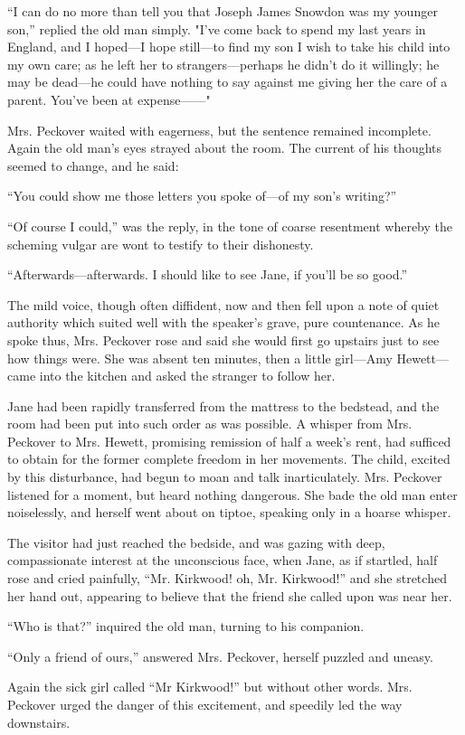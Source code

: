 ``I can do no more than tell you that Joseph James Snowdon was my
younger son,'' replied the old man simply. "I've come back to spend my
last years in England, and I hoped---I hope still---to find my son {}I
wish to take his child into my own care; as he left her to
strangers---perhaps he didn't do it willingly; he may be dead---he could
have nothing to say against me giving her the care of a parent. You've
been at expense{{------}}"

Mrs. Peckover waited with eagerness, but the sentence remained
incomplete. Again the old man's eyes strayed about the room. The current
of his thoughts seemed to change, and he said:

``You could show me those letters you spoke of---of my son's writing?''

``Of course I could,'' was the reply, in the tone of coarse resentment
whereby the scheming vulgar are wont to testify to their dishonesty.

``Afterwards---afterwards. I should like to see Jane, if you'll be so
good.''

The mild voice, though often diffident, now and then fell upon a note of
quiet authority which suited well with the speaker's grave, pure
countenance. As he spoke thus, Mrs. Peckover rose and said she would
first go upstairs just to see how things were. She was {}absent ten
minutes, then a little girl---Amy Hewett---came into the kitchen and
asked the stranger to follow her.

Jane had been rapidly transferred from the mattress to the bedstead, and
the room had been put into such order as was possible. A whisper from
Mrs. Peckover to Mrs. Hewett, promising remission of half a week's rent,
had sufficed to obtain for the former complete freedom in her movements.
The child, excited by this disturbance, had begun to moan and talk
inarticulately. Mrs. Peckover listened for a moment, but heard nothing
dangerous. She bade the old man enter noiselessly, and herself went
about on tiptoe, speaking only in a hoarse whisper.

The visitor had just reached the bedside, and was gazing with deep,
compassionate interest at the unconscious face, when Jane, as if
startled, half rose and cried painfully, ``Mr. Kirkwood! oh, Mr.
Kirkwood!'' and she stretched her hand out, appearing to believe that
the friend she called upon was near her.

{}``Who is that?'' inquired the old man, turning to his companion.

``Only a friend of ours,'' answered Mrs. Peckover, herself puzzled and
uneasy.

Again the sick girl called ``Mr Kirkwood!'' but without other words.
Mrs. Peckover urged the danger of this excitement, and speedily led the
way downstairs.
